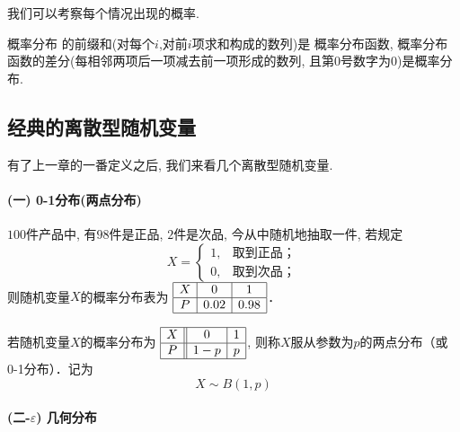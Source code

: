 \begin{takeaway}
    
    我们可以考察每个情况出现的概率. 

    概率分布 的前缀和(对每个$i$,对前$i$项求和构成的数列)是 概率分布函数, 概率分布函数的差分(每相邻两项后一项减去前一项形成的数列, 且第0号数字为0)是概率分布. 
\end{takeaway}


\subsection{经典的离散型随机变量}


有了上一章的一番定义之后, 我们来看几个离散型随机变量.

\paragraph{(一) 0-1分布(两点分布)}

\begin{example}
    $100$件产品中, 有$98$件是正品, $2$件是次品, 今从中随机地抽取一件, 若规定
    \[X=\left\{ \begin{array}{ll} 1, & \text{取到正品；} \\
             0,      & \text{取到次品；}\end{array} \right.\]
    则随机变量$X$的概率分布表为
    $\begin{array}{|c|c|c|}\hline
            X & 0    & 1    \\ \hline
            P & 0.02 & 0.98 \\ \hline
        \end{array}$．
\end{example}

\begin{definition}[两点分布(0-1分布)]
    若随机变量$X$的概率分布为
    $\begin{array}{|c||c|c|}\hline
            X & 0   & 1 \\ \hline
            P & 1-p & p \\ \hline
        \end{array}$, 
    则称$X$服从参数为$p$的两点分布（或 0-1分布）．记为$$X\sim B(1,p)$$
\end{definition}

\paragraph{(二-$\varepsilon$) 几何分布}

